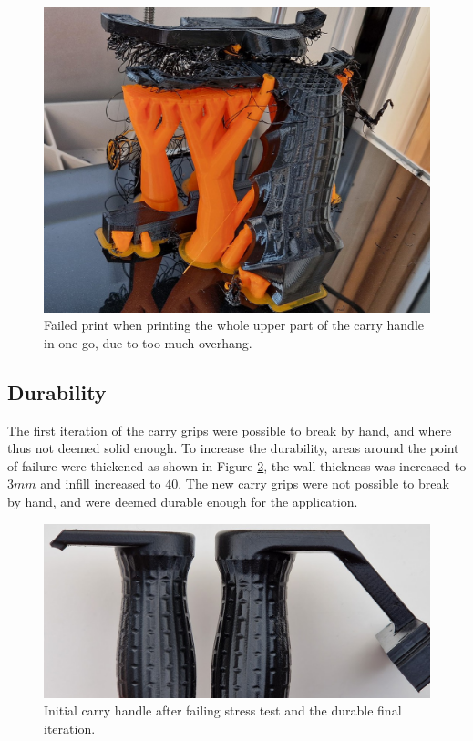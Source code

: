 \begin{figure}[H]
    \centering
    \includegraphics[width=.6\textwidth]{figures/3d_print/failed.jpg}
    \caption{Failed print when printing the whole upper part of the carry handle in one go, due to too much overhang.}
    \label{fig:handle_fail}
\end{figure}


\subsection{Durability}
The first iteration of the carry grips were possible to break by hand, and where thus not deemed solid enough.
To increase the durability, areas around the point of failure were thickened as shown in Figure \ref{fig:handle_thickness}, the wall thickness was increased to $3mm$ and infill increased to $40$.
The new carry grips were not possible to break by hand, and were deemed durable enough for the application.

\begin{figure}[H]
    \centering
    \includegraphics[width=.6\textwidth]{figures/3d_print/thickness.png}
    \caption{Initial carry handle after failing stress test and the durable final iteration.}
    \label{fig:handle_thickness}
\end{figure}

